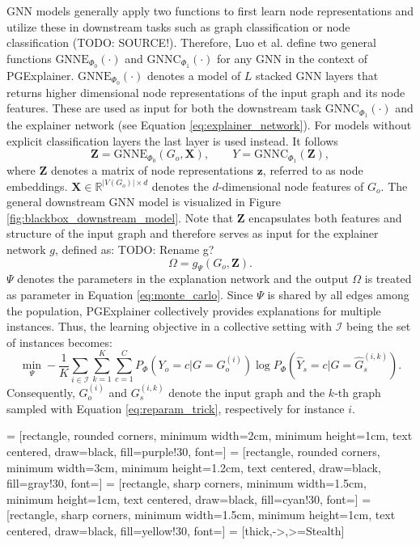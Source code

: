 GNN models generally apply two functions to first learn node representations and utilize these in downstream tasks such as graph classification or node classification (TODO: SOURCE!). Therefore, Luo et al. \cite{luo2020parameterized} define two general functions $\text{GNNE}_{\Phi_0}(\cdot)$ and $\text{GNNC}_{\Phi_1}(\cdot)$ for any GNN in the context of PGExplainer. $\text{GNNE}_{\Phi_0}(\cdot)$ denotes a model of $L$ stacked GNN layers that returns higher dimensional node representations of the input graph and its node features. These are used as input for both the downstream task $\text{GNNC}_{\Phi_1}(\cdot)$ and the explainer network (see Equation \ref{eq:explainer_network}). For models without explicit classification layers the last layer is used instead. It follows
\begin{equation}
    \mathbf{Z} = \text{GNNE}_{\Phi_0}(G_o, \mathbf{X}), \qquad Y = \text{GNNC}_{\Phi_1}(\mathbf{Z}),
\end{equation}
where $\mathbf{Z}$ denotes a matrix of node representations $\mathbf{z}$, referred to as node embeddings. $\mathbf{X} \in \mathbb{R}^{|V(G_o)|\times d}$ denotes the $d$-dimensional node features of $G_o$. The general downstream GNN model is visualized in Figure \ref{fig:blackbox_downstream_model}. Note that $\mathbf{Z}$ encapsulates both features and structure of the input graph and therefore serves as input for the explainer network $g$, defined as:
TODO: Rename g?
\begin{equation}
    \label{eq:explainer_network}
    \Omega = g_\Psi(G_o,\mathbf{Z}).
\end{equation}
$\Psi$ denotes the parameters in the explanation network and the output $\Omega$ is treated as parameter in Equation \ref{eq:monte_carlo}. Since $\Psi$ is shared by all edges among the population, PGExplainer collectively provides explanations for multiple instances. Thus, the learning objective in a collective setting with $\mathcal{I}$ being the set of instances becomes:
\begin{equation}
    \label{eq:mlp_loss}
    \min_\Psi -\frac{1}{K}\sum_{i\in \mathcal{I}}\sum_{k=1}^K\sum_{c=1}^C P_\Phi (Y_o = c|G = G_o^{(i)}) \log P_\Phi(\hat{Y}_s = c|G=\hat{G}_s^{(i,k)}).
\end{equation}
Consequently, $G_o^{(i)}$ and $G_s^{(i,k)}$ denote the input graph and the $k$-th graph sampled with Equation \ref{eq:reparam_trick}, respectively for instance $i$. \bigskip 

 = [rectangle, rounded corners, minimum width=2cm, minimum height=1cm, text centered, draw=black, fill=purple!30, font=\small]
 = [rectangle, rounded corners, minimum width=3cm, minimum height=1.2cm, text centered, draw=black, fill=gray!30, font=\small]
 = [rectangle, sharp corners, minimum width=1.5cm, minimum height=1cm, text centered, draw=black, fill=cyan!30, font=\small]
 = [rectangle, sharp corners, minimum width=1.5cm, minimum height=1cm, text centered, draw=black, fill=yellow!30, font=\small]
 = [thick,->,>=Stealth]    %


